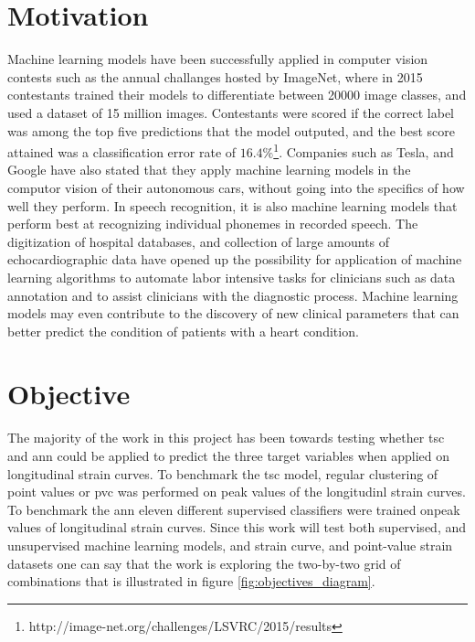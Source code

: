 \section{Motivation} \label{sec:motivation}

Machine learning models have been successfully applied in computer vision contests such as the annual challanges hosted by ImageNet, where in 2015 contestants trained their models to differentiate between 20000 image classes, and used a dataset of 15 million images. Contestants were scored if the correct label was among the top five predictions that the model outputed, and the best score attained was a classification error rate of $16.4\%$\footnote{http://image-net.org/challenges/LSVRC/2015/results}. Companies such as Tesla, and Google have also stated that they apply machine learning models in the computor vision of their autonomous cars, without going into the specifics of how well they perform. In speech recognition, it is also machine learning models that perform best at recognizing individual phonemes in recorded speech. The digitization of hospital databases, and collection of large amounts of echocardiographic data have opened up the possibility for application of machine learning algorithms to automate labor intensive tasks for clinicians such as data annotation and to assist clinicians with the diagnostic process. Machine learning models may even contribute to the discovery of new clinical parameters that can better predict the condition of patients with a heart condition.

\section{Objective} \label{sec:objective}

The majority of the work in this project has been towards testing whether \acrfull{tsc} and \acrfull{ann} could be applied to predict the three target variables when applied on longitudinal strain curves. To benchmark the \acrshort{tsc} model, regular clustering of point values or \acrfull{pvc} was performed on peak values of the longitudinl strain curves. To benchmark the \acrfull{ann} eleven different supervised classifiers were trained onpeak values of longitudinal strain curves. Since this work will test both supervised, and unsupervised machine learning models, and strain curve, and point-value strain datasets one can say that the work is exploring the two-by-two grid of combinations that is illustrated in figure \ref{fig:objectives_diagram}.

